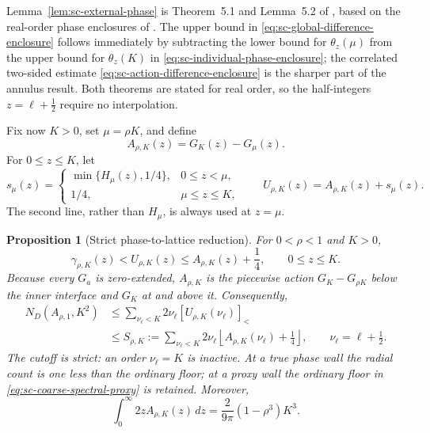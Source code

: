 \documentclass[11pt]{article}
\numberwithin{equation}{section}
\newtheorem{proposition}[theorem]{Proposition}
\theoremstyle{definition}
\theoremstyle{remark}
\begin{document}
Lemma~\ref{lem:sc-external-phase} is Theorem~5.1 and Lemma~5.2 of
\cite{FLPSannuli}, based on the real-order phase enclosures of
\cite{FLPSphase}.  The upper bound in
\eqref{eq:sc-global-difference-enclosure} follows immediately by subtracting
the lower bound for \(\theta_z(\mu)\) from the upper bound for
\(\theta_z(K)\) in \eqref{eq:sc-individual-phase-enclosure}; the correlated
two-sided estimate \eqref{eq:sc-action-difference-enclosure} is the sharper
part of the annulus result.  Both theorems are stated for real order, so the
half-integers \(z=\ell+\tfrac12\) require no interpolation.

Fix now \(K>0\), set \(\mu=\rho K\), and define
\begin{equation}
  A_{\rho,K}(z)=G_K(z)-G_\mu(z).
  \label{eq:sc-shell-action}
\end{equation}
For \(0\le z\le K\), let
\begin{equation}
  s_\mu(z)=
  \begin{cases}
  \min\{H_\mu(z),1/4\},&0\le z<\mu,\\
  1/4,&\mu\le z\le K,
  \end{cases}
  \qquad
  U_{\rho,K}(z)=A_{\rho,K}(z)+s_\mu(z).
  \label{eq:sc-optimized-proxy}
\end{equation}
The second line, rather than \(H_\mu\), is always used at \(z=\mu\).

\begin{proposition}[Strict phase-to-lattice reduction]
\label{prop:sc-phase-lattice}
For \(0<\rho<1\) and \(K>0\),
\begin{equation}
  \gamma_{\rho,K}(z)<U_{\rho,K}(z)
  \le A_{\rho,K}(z)+\frac14,
  \qquad 0\le z\le K.
  \label{eq:sc-pointwise-phase-proxy}
\end{equation}
Because every \(G_a\) is zero-extended, \(A_{\rho,K}\) is the piecewise
action \(G_K-G_{\rho K}\) below the inner interface and \(G_K\) at and
above it.  Consequently,
\begin{align}
  N_D(A_{\rho,1},K^2)
  &\le
  \sum_{\nu_\ell<K}2\nu_\ell
  [U_{\rho,K}(\nu_\ell)]_<
  \label{eq:sc-optimized-spectral-proxy}\\
  &\le
  S_{\rho,K}:=
  \sum_{\nu_\ell<K}2\nu_\ell
  \left\lfloor A_{\rho,K}(\nu_\ell)+\frac14\right\rfloor,
  \qquad \nu_\ell=\ell+\frac12.
  \label{eq:sc-coarse-spectral-proxy}
\end{align}
The cutoff is strict: an order \(\nu_\ell=K\) is inactive.  At a true phase
wall the radial count is one less than the ordinary floor; at a proxy wall
the ordinary floor in \eqref{eq:sc-coarse-spectral-proxy} is retained.
Moreover,
\begin{equation}
  \int_0^\infty2zA_{\rho,K}(z)\,dz
  =\frac{2}{9\pi}(1-\rho^3)K^3.
  \label{eq:sc-exact-action-integral}
\end{equation}
\end{proposition}
\end{document}
